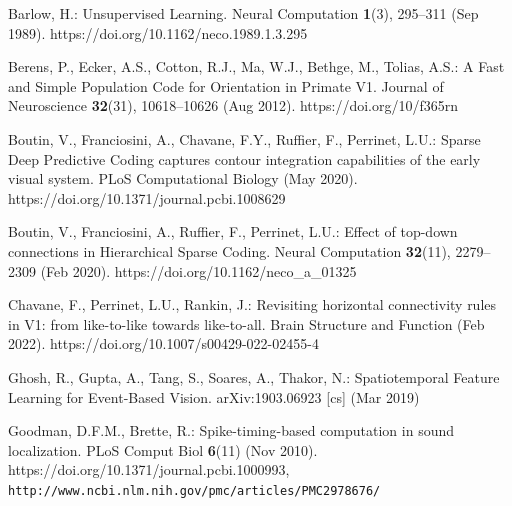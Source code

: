 \documentclass[runningheads]{llncs}
\begin{document}
\begin{thebibliography}{10}
  \providecommand{\url}[1]{\texttt{#1}}
  \providecommand{\urlprefix}{URL }
  \providecommand{\doi}[1]{https://doi.org/#1}
  
  
  Barlow, H.: Unsupervised {Learning}. Neural Computation  \textbf{1}(3),  295--311 (Sep 1989). \doi{10.1162/neco.1989.1.3.295}
  
  Berens, P., Ecker, A.S., Cotton, R.J., Ma, W.J., Bethge, M., Tolias, A.S.: A {Fast} and {Simple} {Population} {Code} for {Orientation} in {Primate} {V1}. Journal of Neuroscience  \textbf{32}(31),  10618--10626 (Aug 2012). \doi{10/f365rn}
  
  
  Boutin, V., Franciosini, A., Chavane, F.Y., Ruffier, F., Perrinet, L.U.: Sparse {Deep} {Predictive} {Coding} captures contour integration capabilities of the early visual system. PLoS Computational Biology  (May 2020). \doi{10.1371/journal.pcbi.1008629}
  
  Boutin, V., Franciosini, A., Ruffier, F., Perrinet, L.U.: Effect of top-down connections in {Hierarchical} {Sparse} {Coding}. Neural Computation  \textbf{32}(11),  2279--2309 (Feb 2020). \doi{10.1162/neco_a_01325}
  
  Chavane, F., Perrinet, L.U., Rankin, J.: Revisiting horizontal connectivity rules in {V1}: from like-to-like towards like-to-all. Brain Structure and Function  (Feb 2022). \doi{10.1007/s00429-022-02455-4}

  Ghosh, R., Gupta, A., Tang, S., Soares, A., Thakor, N.: Spatiotemporal {Feature} {Learning} for {Event}-{Based} {Vision}. arXiv:1903.06923 [cs]  (Mar 2019)

Goodman, D.F.M., Brette, R.: Spike-timing-based computation in sound localization. PLoS Comput Biol  \textbf{6}(11) (Nov 2010). \doi{10.1371/journal.pcbi.1000993}, \url{http://www.ncbi.nlm.nih.gov/pmc/articles/PMC2978676/}


\end{thebibliography}
\end{document}
